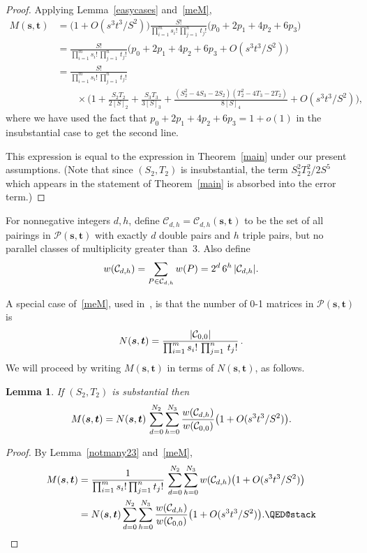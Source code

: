 \documentclass[12pt]{article}
\newtheorem{lemma}[theorem]{Lemma}
\numberwithin{equation}{section}
\def\C{{\mathcal{C}}}
\def\P{{\mathcal{P}}}
\def\({\bigl(}   \def\){\bigr)}
\def\svec{{\boldsymbol{s}}}
\def\tvec{{\boldsymbol{t}}}
\def\ac#1{\card{\C_{#1}}}
\def\Pst{{\P(\svec,\tvec)}}
\begin{document}
\begin{proof}
Applying Lemma~\ref{easycases} and~\eqref{meM},
\begin{align*} M(\svec,\tvec) 
  &= \( 1+O(s^3t^3/S^2) \)
  \frac{S!}{\prod_{i=1}^m s_i!\,\prod_{j=1}^n \,t_j!}
  \( p_0 + 2p_1 + 4p_2 + 6p_3 \) \\
  &= 
  \frac{S!}{\prod_{i=1}^m s_i!\,\prod_{j=1}^n \,t_j!}
  \( p_0 + 2p_1 + 4p_2 + 6p_3 + O(s^3t^3/S^2) \) \\
  &= \frac{S!}{\prod_{i=1}^m s_i!\,\prod_{j=1}^n \,t_j!}\\
  &{\qquad}\times\biggl(
   1 + \frac{S_2T_2}{2[S]_2} + \frac{S_3T_3}{3[S]_3} 
  + \frac{(S_2^2 - 4S_3 - 2S_2)(T_2^2 - 4T_3 - 2T_2)}{8[S]_4} +
  O(s^3t^3/S^2)\biggr),
\end{align*}
where we have used the fact that $p_0+2p_1+4p_2+6p_3=1+o(1)$ in
the insubstantial case to get the second line.

This expression is equal to the expression in Theorem~\ref{main}
under our present assumptions.  (Note that since $(S_2,T_2)$ is 
insubstantial, the term $S_2^2T_2^2/2S^5$ which appears in the
statement of Theorem~\ref{main} is absorbed into the error term.)
\end{proof}

For nonnegative integers $d,h$, define $\C_{d,h}=
\C_{d,h}(\svec,\tvec)$ to be the set of all pairings in $\Pst$ with
exactly $d$ double pairs and $h$ triple pairs, but no parallel
classes of multiplicity greater than~3.
Also define
\[ w(\C_{d,h}) = \sum_{P\in\C_{d,h}} w(P)
     = 2^d \, 6^h\, \ac{d,h}. \]

A special case of~\eqref{meM}, used in~\cite{GMW}, is that the
number of 0-1 matrices in $\Pst$ is
\[
    N(\svec,\tvec) 
      = \frac{\ac{0,0}}
             {\prod_{i=1}^m s_i!\,\prod_{j=1}^n \,t_j!}\,.
\]
We will proceed by writing $M(\svec,\tvec)$ in terms of
$N(\svec,\tvec)$, as follows.


\begin{lemma}\label{2.3.2}
If $(S_2,T_2)$ is substantial then
\[ M(\svec,\tvec) = 
     N(\svec,\tvec)\, \sum_{d=0}^{N_2}\sum_{h=0}^{N_3}
         \frac{w(\C_{d,h})}{w(\C_{0,0})} \(1 + O(s^3t^3/S^2)\).
         \vadjust{\vskip-1ex}
\]
\end{lemma}
\begin{proof}
By Lemma~\ref{notmany23} and~\eqref{meM},
\begin{align*}
  M(\svec,\tvec) &= 
  \frac{1}{\prod_{i=1}^m s_i!\prod_{j=1}^n t_j!}
      \,\sum_{d=0}^{N_2}\sum_{h=0}^{N_3} w(\C_{d,h})
         \(1 + O(s^3t^3/S^2)\) \\
 &=
  N(\svec,\tvec)
      \sum_{d=0}^{N_2}\sum_{h=0}^{N_3}
        \frac{w(\C_{d,h})}{w(\C_{0,0})} \(1 + O(s^3t^3/S^2)\).\qedhere
\end{align*}
\end{proof}
\end{document}

